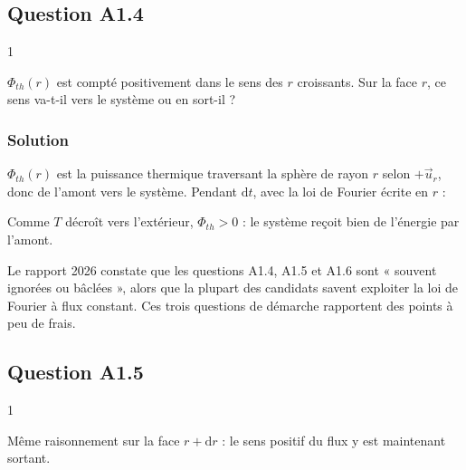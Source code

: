 \documentclass[11pt,a4paper]{article}
\newcommand{\equationajustee}[1]{%
  \sbox{\boiteequation}{$\displaystyle #1$}%
  \ifdim\wd\boiteequation>\linewidth
    \[\resizebox{\linewidth}{!}{\usebox{\boiteequation}}\]%
  \else
    \[#1\]%
  \fi}
\begin{document}
\hypertarget{question-a1.4}{%
\subsection{Question A1.4}\label{question-a1.4}}

\begin{indication}{1}

\(\Phi_{th}(r)\) est compté positivement dans le sens des \(r\) croissants. Sur la face \(r\), ce sens va-t-il vers le système ou en sort-il ?

\end{indication}

\hypertarget{solution-3}{%
\subsubsection{Solution}\label{solution-3}}

\(\Phi_{th}(r)\) est la puissance thermique traversant la sphère de rayon \(r\) selon \(+\vec u_r\), donc de l'amont vers le système. Pendant \(\mathrm{d}t\), avec la loi de Fourier écrite en \(r\) :

\equationajustee{\boxed{\delta_e Q = \Phi_{th}(r)\,\mathrm{d}t = -\lambda S \left(\frac{\mathrm{d}T}{\mathrm{d}r}\right)_r \mathrm{d}t}}

Comme \(T\) décroît vers l'extérieur, \(\Phi_{th} > 0\) : le système reçoit bien de l'énergie par l'amont.

\begin{jury}

Le rapport 2026 constate que les questions A1.4, A1.5 et A1.6 sont « souvent ignorées ou bâclées », alors que la plupart des candidats savent exploiter la loi de Fourier à flux constant. Ces trois questions de démarche rapportent des points à peu de frais.

\end{jury}

\hypertarget{question-a1.5}{%
\subsection{Question A1.5}\label{question-a1.5}}

\begin{indication}{1}

Même raisonnement sur la face \(r + \mathrm{d}r\) : le sens positif du flux y est maintenant sortant.

\end{indication}
\end{document}
